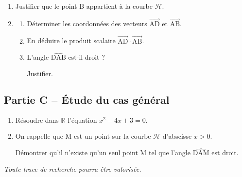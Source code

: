 \documentclass[10pt]{article}
\providecommand{\R}{\mathbb{R}}
\providecommand{\vectt}[1]{\overrightarrow{\mathrm{#1}}}
\begin{document}
	\begin{enumerate}
		\item Justifier que le point B appartient à la courbe $\mathcal{H}$.
		\item \begin{enumerate}
			\item Déterminer les coordonnées des vecteurs $\vectt{AD}$ et $\vectt{AB}$.

			\item En déduire le produit scalaire $\vectt{AD}\cdot\vectt{AB}$.

			\item L'angle $\widehat{\mathrm{DAB}}$ est-il droit ?

			Justifier.
		\end{enumerate}
	\end{enumerate}

	\subsection*{Partie C -- Étude du cas général}

	\begin{enumerate}
		\item Résoudre dans $\R$ l'équation \quad $x^2 - 4x + 3 = 0$.
		\item On rappelle que M est un point sur la courbe $\mathcal{H}$ d'abscisse $x>0$.

		Démontrer qu'il n'existe qu'un seul point M tel que l'angle $\widehat{\mathrm{DAM}}$ est droit.
	\end{enumerate}

	\vspace{1em}
	\emph{Toute trace de recherche pourra être valorisée.}
\end{document}
